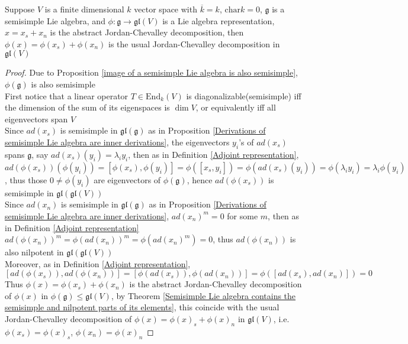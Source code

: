 \documentclass[main]{subfiles}
\begin{document}
\begin{corollary}
Suppose $V$ is a finite dimensional $k$ vector space with $\overline{k}=k$, $\mathrm{char}k=0$, $\mathfrak{g}$ is a semisimple Lie algebra, and $\phi:\mathfrak{g}\to\mathfrak{gl}(V)$ is a Lie algebra representation, $x=x_s+x_n$ is the abstract Jordan-Chevalley decomposition, then $\phi(x)=\phi(x_s)+\phi(x_n)$ is the usual Jordan-Chevalley decomposition in $\mathfrak{gl}(V)$
\end{corollary}

\begin{proof}
Due to Proposition \ref{image of a semisimple Lie algebra is also semisimple}, $\phi(\mathfrak{g})$ is also semisimple \\
First notice that a linear operator $T\in\mathrm{End}_{k}(V)$ is diagonalizable(semisimple) iff the dimension of the sum of its eigenspaces is $\dim V$, or equivalently iff all eigenvectors span $V$ \\
Since $ad(x_s)$ is semisimple in $\mathfrak{gl}(\mathfrak{g})$ as in Proposition \ref{Derivations of semisimple Lie algebra are inner derivations}, the eigenvectors $y_i$'s of $ad(x_s)$ spans $\mathfrak{g}$, say $ad(x_s)(y_i)=\lambda_iy_i$, then as in Definition \ref{Adjoint representation}, $ad(\phi(x_s))(\phi(y_i))=[\phi(x_s),\phi(y_i)]=\phi([x_s,y_i])=\phi(ad(x_s)(y_i))=\phi(\lambda_iy_i)=\lambda_i\phi(y_i)$, thus those $0\neq\phi(y_i)$ are eigenvectors of $\phi(\mathfrak{g})$, hence $ad(\phi(x_s))$ is semisimple in $\mathfrak{gl}\left(\mathfrak{gl}(V)\right)$ \\
Since $ad(x_n)$ is semisimple in $\mathfrak{gl}(\mathfrak{g})$ as in Proposition \ref{Derivations of semisimple Lie algebra are inner derivations}, $ad(x_n)^m=0$ for some $m$, then as in Definition \ref{Adjoint representation} $ad(\phi(x_n))^m=\phi(ad(x_n))^m=\phi(ad(x_n)^m)=0$, thus $ad(\phi(x_n))$ is also nilpotent in $\mathfrak{gl}\left(\mathfrak{gl}(V)\right)$ \\
Moreover, as in Definition \ref{Adjoint representation}, $[ad(\phi(x_s)),ad(\phi(x_n))]=[\phi(ad(x_s)),\phi(ad(x_n))]=\phi([ad(x_s),ad(x_n)])=0$ \\
Thus $\phi(x)=\phi(x_s)+\phi(x_n)$ is the abstract Jordan-Chevalley decomposition of $\phi(x)$ in $\phi(\mathfrak{g})\leq\mathfrak{gl}(V)$, by Theorem \ref{Semisimple Lie algebra contains the semisimple and nilpotent parts of its elements}, this coincide with the usual Jordan-Chevalley decomposition of $\phi(x)=\phi(x)_s+\phi(x)_n$ in $\mathfrak{gl}(V)$, i.e. $\phi(x_s)=\phi(x)_s$, $\phi(x_n)=\phi(x)_n$
\end{proof}
\end{document}
